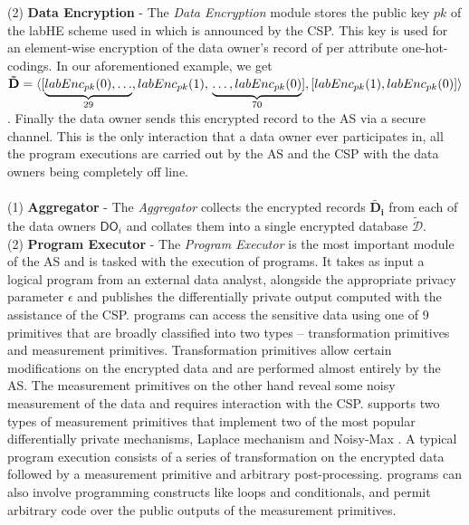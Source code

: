 (2)\textbf{ Data Encryption} - The \textit{Data Encryption} module stores the public key $pk$ of the labHE scheme used in \system which is announced by the CSP. This key is used for an element-wise encryption of the data owner's  record of per attribute one-hot-codings. In our aforementioned example, we get $\mathbf{\tilde{D}}=\langle[\underbrace{labEnc_{pk}(0),\ldots}_{29},labEnc_{pk}(1),\\\underbrace{\ldots,labEnc_{pk}(0)}_{70}],
[labEnc_{pk}(1),labEnc_{pk}(0)]\rangle$. Finally the data owner sends this encrypted record to the \textsf{AS} via a secure channel. This is the only interaction that a data owner ever participates in, all the program executions are carried out by the \textsf{AS} and the \textsf{CSP} with the data owners being completely off line.\\
\\
(1)\textbf{  Aggregator} - The \textit{Aggregator} collects the encrypted records $\mathbf{\tilde{D_i}}$ from each of the data owners $\textsf{DO}_i$ and collates them into a single encrypted database $\boldsymbol{\tilde{\mathcal{D}}}$. %
\\(2)\textbf{ Program Executor }- The \textit{Program Executor} is the most important module of the \textsf{AS} and is tasked with the execution of \system programs. It takes as input a logical \system program from an external data analyst, alongside the appropriate privacy parameter $\epsilon$ and publishes the differentially private output computed with the assistance of the \textsf{CSP}. \system programs can access the sensitive data using one of 9 primitives that are  broadly classified into two types -- transformation primitives and measurement primitives. Transformation primitives allow certain modifications on the encrypted data and are performed almost entirely by the \textsf{AS}. The measurement primitives on the other hand reveal some noisy measurement of the data and requires interaction with the \textsf{CSP}. \system supports two types of measurement primitives that implement two of the most popular differentially private mechanisms, Laplace mechanism \cite{Dork} and Noisy-Max \cite{Dork}. A typical \system program execution consists of  a series of transformation on the encrypted data followed by a measurement primitive and arbitrary post-processing. \system programs can also involve programming constructs like loops and conditionals, and permit arbitrary code over the public outputs of the measurement primitives. 

